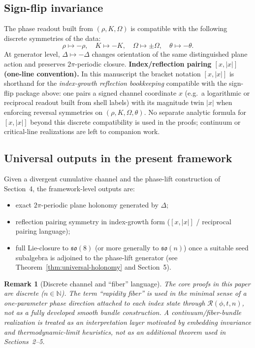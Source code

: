 \documentclass[11pt]{amsart}
\newtheorem{remark}[theorem]{Remark}
\begin{document}
\subsection*{Sign-flip invariance}
The phase readout built from \((\rho,K,\Omega)\) is compatible with the following discrete symmetries of the data:
\[
\rho\mapsto -\rho,\quad K\mapsto -K,\quad \Omega\mapsto \pm \Omega,\quad \theta\mapsto -\theta.
\]
At generator level, \(\Delta\mapsto -\Delta\) changes orientation of the same distinguished plane action and preserves \(2\pi\)-periodic closure.
\textbf{Index/reflection pairing \([x,|x|]\) (one-line convention).}
In this manuscript the bracket notation \([x,|x|]\) is shorthand for the \emph{index-growth reflection bookkeeping} compatible with the sign-flip package above: one pairs a signed channel coordinate \(x\) (e.g.\ a logarithmic or reciprocal readout built from shell labels) with its magnitude twin \(|x|\) when enforcing reversal symmetries on \((\rho,K,\Omega,\theta)\). No separate analytic formula for \([x,|x|]\) beyond this discrete compatibility is used in the proofs; continuum or critical-line realizations are left to companion work.

\subsection*{Universal outputs in the present framework}
Given a divergent cumulative channel and the phase-lift construction of Section~4, the framework-level outputs are:
\begin{itemize}
  \item exact \(2\pi\)-periodic plane holonomy generated by \(\Delta\);
  \item reflection pairing symmetry in index-growth form (\([x,|x|]\) / reciprocal pairing language);
  \item full Lie-closure to \(\mathfrak{so}(8)\) (or more generally to \(\mathfrak{so}(n)\)) once a suitable seed subalgebra is adjoined to the phase-lift generator (see Theorem~\ref{thm:universal-holonomy} and Section~5).
\end{itemize}

\begin{remark}[Discrete channel and ``fiber'' language]
The core proofs in this paper are discrete (\(n\in\mathbb N\)). The term ``rapidity fiber'' is used in the minimal sense of a one-parameter phase direction attached to each index state through \(\mathcal R(\phi,t,n)\), not as a fully developed smooth bundle construction. A continuum/fiber-bundle realization is treated as an interpretation layer motivated by embedding invariance and thermodynamic-limit heuristics, not as an additional theorem used in Sections~2--5.
\end{remark}
\end{document}
